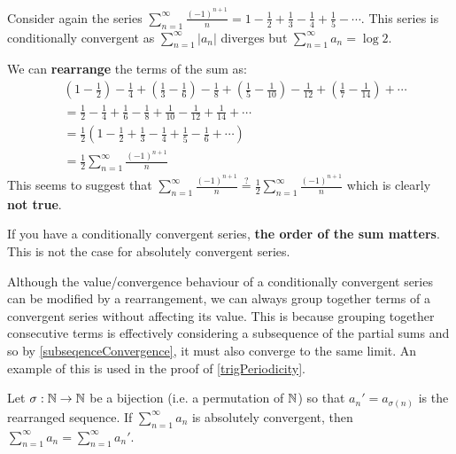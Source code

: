 \documentclass[../main.tex]{subfiles}
\begin{document}
\begin{example}
  Consider again the series $\sum_{n = 1}^{\infty} \frac{(-1)^{n + 1}}{n} = 1 - \frac{1}{2} + \frac{1}{3} - \frac{1}{4} + \frac{1}{5} - \cdots$.
  This series is conditionally convergent as $\sum_{n = 1}^{\infty} |a_n|$ diverges but $\sum_{n = 1}^{\infty} a_n = \log 2$.

  We can \textbf{rearrange} the terms of the sum as:
  \begin{align*}
    &\left(1 - \frac{1}{2}\right) - \frac{1}{4} + \left(\frac{1}{3} - \frac{1}{6}\right) - \frac{1}{8} + \left(\frac{1}{5} - \frac{1}{10}\right) - \frac{1}{12} + \left(\frac{1}{7} - \frac{1}{14}\right) + \cdots \\
    &= \frac{1}{2} - \frac{1}{4} + \frac{1}{6} - \frac{1}{8} + \frac{1}{10} - \frac{1}{12} + \frac{1}{14} + \cdots \\
    &= \frac{1}{2}\left(1 - \frac{1}{2} + \frac{1}{3} - \frac{1}{4} + \frac{1}{5} - \frac{1}{6} + \cdots\right) \\
    &= \frac{1}{2}\sum_{n = 1}^{\infty} \frac{(-1)^{n + 1}}{n}
  \end{align*}
  This seems to suggest that $\sum_{n = 1}^{\infty} \frac{(-1)^{n + 1}}{n} \stackrel{?}= \frac{1}{2} \sum_{n = 1}^{\infty} \frac{(-1)^{n + 1}}{n}$ which is clearly \textbf{not true}.

  If you have a conditionally convergent series, \textbf{the order of the sum matters}.
  This is not the case for absolutely convergent series.
\end{example}
\begin{remark}
  Although the value/convergence behaviour of a conditionally convergent series can be modified by a rearrangement, we can always group together terms of a convergent series without affecting its value.
  This is because grouping together consecutive terms is effectively considering a subsequence of the partial sums and so by \cref{subseqenceConvergence}, it must also converge to the same limit.
  An example of this is used in the proof of \cref{trigPeriodicity}.
\end{remark}
\begin{proposition} \label{absoluteRearrangement}
  Let $\sigma: \mathbb{N} \to \mathbb{N}$ be a bijection (i.e. a permutation of $\mathbb{N}$) so that $a_n' = a_{\sigma(n)}$ is the rearranged sequence.
  If $\sum_{n = 1}^{\infty} a_n$ is absolutely convergent, then $\sum_{n = 1}^{\infty} a_n = \sum_{n = 1}^{\infty} a_n'$.
\end{proposition}
\end{document}
